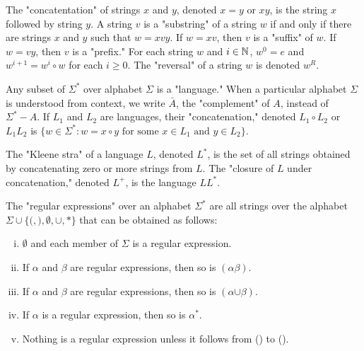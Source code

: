 \documentclass[a4paper,8pt]{article}
\begin{document}
\begin{outline}
    The "concatentation" of strings \(x\) and \(y\), denoted \(x = y\) or \(xy\), is the string \(x\) followed by
    string \(y\). A string \(v\) is a "substring" of a string \(w\) if and only if there are strings \(x\) and \(y\)
    such that \(w = xvy\). If \(w = xv\), then \(v\) is a "suffix" of \(w\). If \(w = vy\), then \(v\) is a "prefix."
    For each string \(w\) and \(i \in \mathbb{N}\), \(w^0 = e\) and \(w^{i+1} = w^i \circ w\) for each \(i \geq 0\). The
    "reversal" of a string \(w\) is denoted \(w^R\).

    Any subset of \(\Sigma^*\) over alphabet \(\Sigma\) is a "language." When a particular alphabet \(\Sigma\) is
    understood from context, we write \(\bar{A}\), the "complement" of \(A\), instead of \(\Sigma^*-A\). If \(L_1\)
    and \(L_2\) are languages, their "concatenation," denoted \(L_1 \circ L_2\) or \(L_1L_2\) is \(\{w \in \Sigma^*:
    w = x \circ y\text{ for some }x \in L_1\text{ and }y \in L_2\}\).

    The "Kleene stra" of a language \(L\), denoted \(L^*\), is the set of all strings obtained by concatenating zero
    or more strings from \(L\). The "closure of \(L\) under concatenation," denoted \(L^+\), is the language \(LL^*\).

    The "regular expressions" over an alphabet \(\Sigma^*\) are all strings over the alphabet \(\Sigma \cup \{\pmb{(},
    \pmb{)}, \pmb{\emptyset}, \pmb{\cup}, \pmb{*}\}\) that can be obtained as follows:
    \begin{enumerate}[i.]
      \item \(\pmb{\emptyset}\) and each member of \(\Sigma\) is a regular expression.
      \item If \(\alpha\) and \(\beta\) are regular expressions, then so is \((\alpha\beta)\).
      \item If \(\alpha\) and \(\beta\) are regular expressions, then so is \((\alpha\pmb{\cup}\beta)\).
      \item If \(\alpha\) is a regular expression, then so is \(\alpha^{\pmb{*}}\).
      \item Nothing is a regular expression unless it follows from () to ().
    \end{enumerate}


\end{outline}
\end{document}
